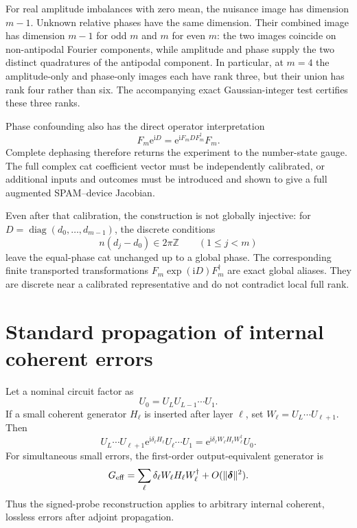 \documentclass[aps,pra,reprint,amsmath,amssymb,superscriptaddress,longbibliography]{revtex4-2}
\newcommand{\ii}{\mathrm{i}}
\newcommand{\ee}{\mathrm{e}}
\begin{document}
For real amplitude imbalances with zero mean, the nuisance image has
dimension $m-1$.  Unknown relative phases have the same dimension.  Their
combined image has dimension $m-1$ for odd $m$ and $m$ for even $m$:
the two images coincide on non-antipodal Fourier components, while
amplitude and phase supply the two distinct quadratures of the antipodal
component.  In particular, at $m=4$ the amplitude-only and phase-only
images each have rank three, but their union has rank four rather than six.
The accompanying exact Gaussian-integer test certifies these three ranks.

Phase confounding also has the direct operator interpretation
\begin{equation}
 F_m\ee^{\ii D}
 =\ee^{\ii F_mDF_m^\dagger}F_m.
\label{eq:cat-phase-confounding}
\end{equation}
Complete dephasing therefore returns the experiment to the number-state
gauge.  The full complex cat coefficient vector must be independently
calibrated, or additional inputs and outcomes must be introduced and shown
to give a full augmented SPAM--device Jacobian.

Even after that calibration, the construction is not globally injective:
for $D=\operatorname{diag}(d_0,\ldots,d_{m-1})$, the discrete conditions
\begin{equation}
 n(d_j-d_0)\in2\pi\mathbb Z\qquad(1\leq j<m)
\label{eq:cat-global-alias}
\end{equation}
leave the equal-phase cat unchanged up to a global phase.  The corresponding
finite transported transformations $F_m\exp(\ii D)F_m^\dagger$ are exact
global aliases.  They are discrete near a calibrated representative and do
not contradict local full rank.

\section{Standard propagation of internal coherent errors}
\label{sec:internal}

Let a nominal circuit factor as
\begin{equation}
 U_0=U_LU_{L-1}\cdots U_1.
\end{equation}
If a small coherent generator $H_\ell$ is inserted after layer $\ell$, set
$W_\ell=U_L\cdots U_{\ell+1}$.  Then
\begin{equation}
 U_L\cdots U_{\ell+1}
 \ee^{\ii\delta_\ell H_\ell}
 U_\ell\cdots U_1
 =
 \ee^{\ii\delta_\ell W_\ell H_\ell W_\ell^\dagger}U_0.
\label{eq:single-internal}
\end{equation}
For simultaneous small errors, the first-order output-equivalent generator
is
\begin{equation}
 G_{\rm eff}
 =\sum_\ell\delta_\ell
 W_\ell H_\ell W_\ell^\dagger+O(\|\bm\delta\|^2).
\label{eq:effective-generator}
\end{equation}
Thus the signed-probe reconstruction applies to arbitrary internal coherent,
lossless errors after adjoint propagation.
\end{document}
